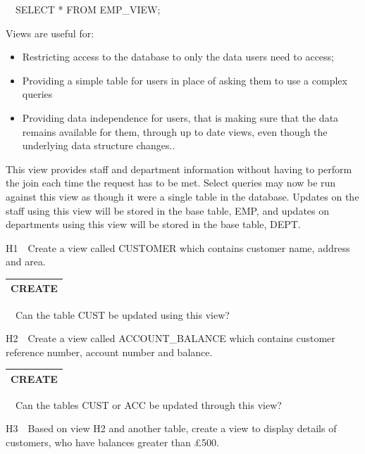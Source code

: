 \ \ SELECT * FROM EMP\_VIEW;

Views are useful for:

\begin{itemize}
\item Restricting access to the database to only the data users need to access;
\item Providing a simple table for users in place of asking them to use a complex queries
\item Providing data independence for users, that is making sure that the data remains available for them, through up to date views, even though the underlying  data structure changes..
\end{itemize}
This view provides staff and department information without having to perform the join each time the request has to be met.  Select queries may now be run against this view as though it were a single table in the database.  Updates on the staff using this view will be stored in the base table, EMP, and updates on departments using this view will be stored in the base table, DEPT.

H1\ \ Create a view called CUSTOMER which contains customer name, address and area.

\begin{flushleft}
\tablefirsthead{}
\tablehead{}
\tabletail{}
\tablelasttail{}
\begin{supertabular}{|m{14.303cm}|}
\hline
CREATE

\\\hline
\end{supertabular}
\end{flushleft}
\ \ Can the table CUST be updated using this view?

H2\ \ Create a view called ACCOUNT\_BALANCE which contains customer reference number, account number and balance.

\begin{flushleft}
\tablefirsthead{}
\tablehead{}
\tabletail{}
\tablelasttail{}
\begin{supertabular}{|m{14.583cm}|}
\hline
CREATE

\\\hline
\end{supertabular}
\end{flushleft}
\ \ Can the tables CUST or ACC be updated through this view?

H3\ \ Based on view H2 and another table, create a view to display details of customers, who have balances greater than £500.

